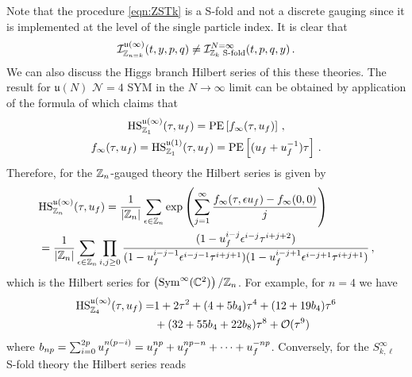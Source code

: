 \documentclass[main.tex]{subfiles}
\begin{document}
Note that the procedure \eqref{eqn:ZSTk} is a S-fold and not a discrete gauging since it is implemented at the level of the single particle index.
It is clear that 
\begin{equation}
\mathcal{I}^{\mathfrak{u}(\infty)}_{\mathbb{Z}_{{n}=k}}(t,y,p,q)\neq \mathcal{I}^{N=\infty}_{\mathbb{Z}_k\text{ S-fold}}(t,p,q,y)\,.
\end{equation}
We can also discuss the Higgs branch Hilbert series of this these theories. The result for $\mathfrak{u}(N)$ $\mathcal{N}=4$ SYM in the $N\to\infty$ limit can be obtained by application of the formula of \cite{Benvenuti:2006qr} which claims that
\begin{gather}
\textrm{HS}_{\mathbb{Z}_1}^{\mathfrak{u}(\infty)}(\tau,u_f)=\operatorname{\mathrm{PE}}\left[f_{\infty}(\tau,u_f)\right]\,,\\ f_{\infty}(\tau,u_f)=\textrm{HS}_{\mathbb{Z}_1}^{\mathfrak{u}(1)}(\tau,u_f)=\operatorname{\mathrm{PE}}\left[(u_f+u_f^{-1})\tau\right]\,.
\end{gather}
Therefore, for the $\mathbb{Z}_{n}$-gauged theory the Hilbert series is given by
\begin{align}
&\textrm{HS}_{\mathbb{Z}_n}^{\mathfrak{u}(\infty)}(\tau,u_f)=\frac{1}{|\mathbb{Z}_n|}\sum_{\epsilon\in\mathbb{Z}_n}\exp\left(\sum_{j=1}^{\infty}\frac{f_{\infty}(\tau,\epsilon u_f)-f_{\infty}(0,0)}{j}\right)\\
&=\frac{1}{|\mathbb{Z}_n|}\sum_{\epsilon\in\mathbb{Z}_n}\prod_{i,j\geq0}\frac{(1-  u_f^{i-j}\epsilon^{i-j}\tau^{i+j+2})}{(1-  u_f^{i-j-1}\epsilon^{i-j-1}\tau^{i+j+1})(1-  u_f^{i-j+1}\epsilon^{i-j+1}\tau^{i+j+1})}\,,
\end{align}
which is the Hilbert series for $\left(\operatorname{Sym}^{\infty}(\mathbb{C}^2)\right)/\mathbb{Z}_n$. For example, for $n=4$ we have
\begin{equation}
\begin{aligned}
\textrm{HS}_{\mathbb{Z}_4}^{\mathfrak{u}(\infty)}(\tau,u_f)=&1+2\tau^2+(4+5b_4)\tau^4+(12+19b_4)\tau^6\\
&+(32+55b_4+22b_8)\tau^8+\mathcal{O}(\tau^9)
\end{aligned}
\end{equation}
where $b_{n p}=\sum_{i=0}^{2p}u_f^{n(p-i)}=u_f^{n p}+u_f^{n p-n}+\dots+u_f^{-n p}$.
Conversely, for the $S^{\infty}_{k,\ell}$ S-fold theory the Hilbert series reads
\end{document}
